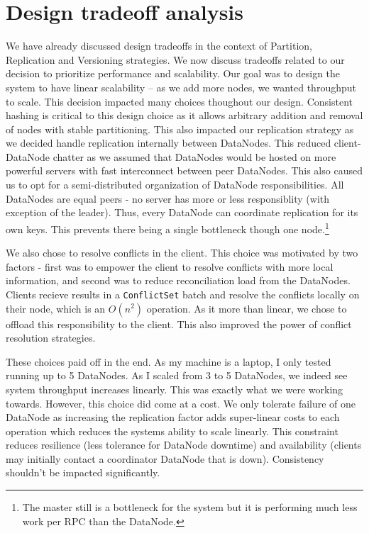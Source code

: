 \documentclass[paper=a4,fontsize=11pt]{report} %
\numberwithin{equation}{section} %
\numberwithin{figure}{section} %
\numberwithin{table}{section} %
\begin{document}
\section{Design tradeoff analysis}
We have already discussed design tradeoffs in the context of Partition, Replication and Versioning strategies. We now discuss tradeoffs related to our decision to prioritize performance and scalability. Our goal was to design the system to have linear scalability -- as we add more nodes, we wanted throughput to scale. This decision impacted many choices thoughout our design. Consistent hashing is critical to this design choice as it allows arbitrary addition and removal of nodes with stable partitioning. This also impacted our replication strategy as we decided handle replication internally between DataNodes. This reduced client-DataNode chatter as we assumed that DataNodes would be hosted on more powerful servers with fast interconnect between peer DataNodes. This also caused us to opt for a semi-distributed organization of DataNode responsibilities. All DataNodes are equal peers - no server has more or less responsiblity (with exception of the leader). Thus, every DataNode can coordinate replication for its own keys. This prevents there being a single bottleneck though one node.\footnote{The master still is a bottleneck for the system but it is performing much less work per RPC than the DataNode.}

We also chose to resolve conflicts in the client. This choice was motivated by two factors - first was to empower the client to resolve conflicts with more local information, and second was to reduce reconciliation load from the DataNodes. Clients recieve results in a \texttt{ConflictSet} batch and resolve the conflicts locally on their node, which is an $O(n^2)$ operation. As it more than linear, we chose to offload this responsibility to the client. This also improved the power of conflict resolution
strategies.

These choices paid off in the end. As my machine is a laptop, I only tested running up to 5 DataNodes. As I scaled from 3 to 5 DataNodes, we indeed see system throughput increases linearly. This was exactly what we were working towards. However, this choice did come at a cost. We only tolerate failure of one DataNode as increasing the replication factor adds super-linear costs to each operation which reduces the systems ability to scale linearly. This constraint reduces resilience (less tolerance for DataNode downtime) and availability (clients may initially contact a coordinator DataNode that is down). Consistency shouldn't be impacted significantly.
\end{document}
